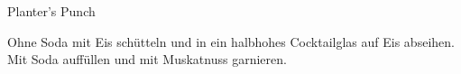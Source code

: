 \documentclass[../recipe-collections/cocktails.tex]{subfiles}
\begin{document}
\begin{recipe}{Planter's Punch}{}{}

  \freeform{}\textit{}


  Ohne Soda mit Eis schütteln und in ein halbhohes Cocktailglas auf Eis abseihen.
  Mit Soda auffüllen und mit Muskatnuss garnieren.

  \freeform{}\hrulefill{}

\end{recipe}
\end{document}
